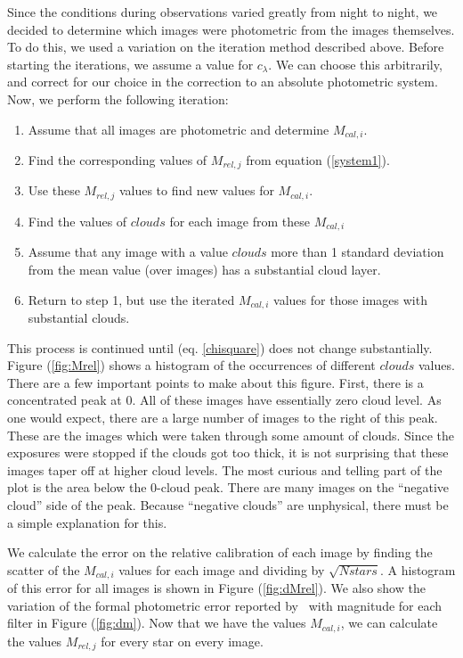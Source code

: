 \documentclass{article}
\begin{document}
        Since the conditions during observations varied greatly from
night to night, we decided to determine which images were photometric
from the images themselves.  To do this, we used a variation on the
iteration method described above.  Before starting the iterations, we
assume a value for $c_{\lambda}$.  We can choose this arbitrarily, and
correct for our choice in the correction to an absolute photometric
system.  Now, we perform the following iteration:

\begin{enumerate}
\setlength{\parskip}{-0.05in}
\item Assume that all images are photometric and determine $M_{cal,i}$.
\item Find the corresponding values of $M_{rel,j}$ from equation (\ref{system1}).
\item Use these $M_{rel,j}$ values to find new values for $M_{cal,i}$.
\item Find the values of $clouds$ for each image from these $M_{cal,i}$
\item Assume that any image with a value $clouds$ more than 1 standard
deviation from the mean value (over images) has a substantial cloud
layer.  
\item Return to step 1, but use the iterated $M_{cal,i}$ values for those
images with substantial clouds.
\end{enumerate}
This process is continued until \chisq (eq. \ref{chisquare}) does not
change substantially.  Figure (\ref{fig:Mrel}) shows a histogram of
the occurrences of different $clouds$ values.  There are a few
important points to make about this figure.  First, there is a
concentrated peak at 0.  All of these images have essentially zero
cloud level.  As one would expect, there are a large number of images
to the right of this peak.  These are the images which were taken
through some amount of clouds.  Since the exposures were stopped if
the clouds got too thick, it is not surprising that these images taper
off at higher cloud levels.  The most curious and telling part of the
plot is the area below the 0-cloud peak.  There are many images on the
``negative cloud'' side of the peak.  Because ``negative clouds'' are
unphysical, there must be a simple explanation for this.

        We calculate the error on the relative calibration of each
image by finding the scatter of the $M_{cal,i}$ values for each image
and dividing by $\sqrt{N stars}$.  A histogram of this error for all
images is shown in Figure (\ref{fig:dMrel}).  We also show the
variation of the formal photometric error reported by \dophot\ with
magnitude for each filter in Figure (\ref{fig:dm}).  Now that we have
the values $M_{cal,i}$, we can calculate the values $M_{rel,j}$ for
every star on every image.
\end{document}
